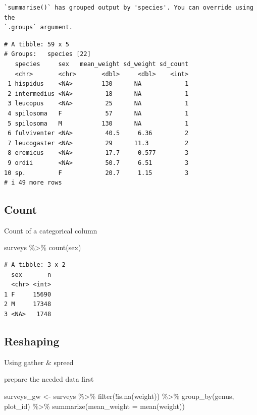 \documentclass[
  letterpaper,
  DIV=11,
  numbers=noendperiod]{scrreprt}
\newenvironment{Shaded}{\begin{snugshade}}{\end{snugshade}}
\newcommand{\AttributeTok}[1]{\textcolor[rgb]{0.40,0.45,0.13}{#1}}
\newcommand{\FunctionTok}[1]{\textcolor[rgb]{0.28,0.35,0.67}{#1}}
\newcommand{\NormalTok}[1]{\textcolor[rgb]{0.00,0.23,0.31}{#1}}
\newcommand{\OtherTok}[1]{\textcolor[rgb]{0.00,0.23,0.31}{#1}}
\newcommand{\SpecialCharTok}[1]{\textcolor[rgb]{0.37,0.37,0.37}{#1}}
\begin{document}
\begin{verbatim}
`summarise()` has grouped output by 'species'. You can override using the
`.groups` argument.
\end{verbatim}

\begin{verbatim}
# A tibble: 59 x 5
# Groups:   species [22]
   species     sex   mean_weight sd_weight sd_count
   <chr>       <chr>       <dbl>     <dbl>    <int>
 1 hispidus    <NA>        130      NA            1
 2 intermedius <NA>         18      NA            1
 3 leucopus    <NA>         25      NA            1
 4 spilosoma   F            57      NA            1
 5 spilosoma   M           130      NA            1
 6 fulviventer <NA>         40.5     6.36         2
 7 leucogaster <NA>         29      11.3          2
 8 eremicus    <NA>         17.7     0.577        3
 9 ordii       <NA>         50.7     6.51         3
10 sp.         F            20.7     1.15         3
# i 49 more rows
\end{verbatim}

\subsection{Count}\label{count}

Count of a categorical column

\begin{Shaded}
\begin{Highlighting}[]
\NormalTok{surveys }\SpecialCharTok{\%\textgreater{}\%}
  \FunctionTok{count}\NormalTok{(sex)}
\end{Highlighting}
\end{Shaded}

\begin{verbatim}
# A tibble: 3 x 2
  sex       n
  <chr> <int>
1 F     15690
2 M     17348
3 <NA>   1748
\end{verbatim}

\subsection{Reshaping}\label{reshaping}

Using gather \& spreed

prepare the needed data first

\begin{Shaded}
\begin{Highlighting}[]
\NormalTok{surveys\_gw }\OtherTok{\textless{}{-}}\NormalTok{ surveys }\SpecialCharTok{\%\textgreater{}\%}
  \FunctionTok{filter}\NormalTok{(}\SpecialCharTok{!}\FunctionTok{is.na}\NormalTok{(weight)) }\SpecialCharTok{\%\textgreater{}\%}
  \FunctionTok{group\_by}\NormalTok{(genus, plot\_id) }\SpecialCharTok{\%\textgreater{}\%}
  \FunctionTok{summarize}\NormalTok{(}\AttributeTok{mean\_weight =} \FunctionTok{mean}\NormalTok{(weight))}
\end{Highlighting}
\end{Shaded}
\end{document}
